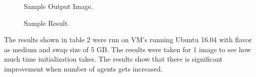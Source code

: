 \documentclass[9pt,twocolumn,twoside]{../../styles/osajnl}
\begin{document}
\begin{figure}[htbp]
\centering
{}
\caption{Sample Output Image.}
\label{fig:false-color}
\end{figure}

\begin{figure}[htbp]
\centering
{}
\caption{Sample Result.}
\label{fig:false-color}
\end{figure}

The results shown in table 2 were run on VM's running Ubuntu 16.04
with flavor as medium and swap size of 5 GB. The results were taken
for 1 image to see how much time initialization takes. The results
show that there is significant improvement when number of agents gets
increased.
\end{document}
